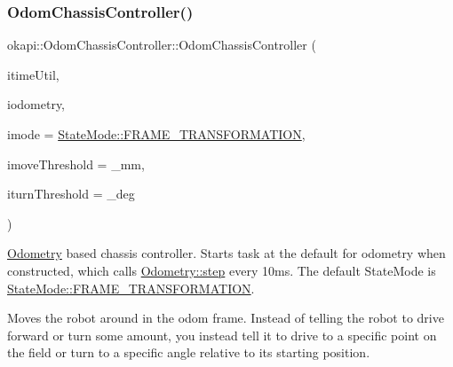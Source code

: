 \subsubsection{\texorpdfstring{OdomChassisController()}{OdomChassisController()}\hspace{0.1cm}{\footnotesize\ttfamily [1/3]}}
{\footnotesize\ttfamily okapi\+::\+Odom\+Chassis\+Controller\+::\+Odom\+Chassis\+Controller (\begin{DoxyParamCaption}\item[{const \mbox{\hyperlink{classokapi_1_1TimeUtil}{Time\+Util}} \&}]{itime\+Util,  }\item[{std\+::unique\+\_\+ptr$<$ \mbox{\hyperlink{classokapi_1_1Odometry}{Odometry}} $>$}]{iodometry,  }\item[{const \mbox{\hyperlink{namespaceokapi_af37fbd761bd859a00ff4dd4a87dd8c07}{State\+Mode}} \&}]{imode = {\ttfamily \mbox{\hyperlink{namespaceokapi_af37fbd761bd859a00ff4dd4a87dd8c07ad5ed7666e5cebf60d3af20a5a46edf3b}{State\+Mode\+::\+F\+R\+A\+M\+E\+\_\+\+T\+R\+A\+N\+S\+F\+O\+R\+M\+A\+T\+I\+ON}}},  }\item[{const Q\+Length \&}]{imove\+Threshold = {\+\_\+mm},  }\item[{const Q\+Angle \&}]{iturn\+Threshold = {\+\_\+deg} }\end{DoxyParamCaption})}

\mbox{\hyperlink{classokapi_1_1Odometry}{Odometry}} based chassis controller. Starts task at the default for odometry when constructed, which calls {\ttfamily \mbox{\hyperlink{classokapi_1_1Odometry_a04586a88418c606f7bbd0ac3287c730d}{Odometry\+::step}}} every {\ttfamily 10ms}. The default State\+Mode is {\ttfamily \mbox{\hyperlink{namespaceokapi_af37fbd761bd859a00ff4dd4a87dd8c07ad5ed7666e5cebf60d3af20a5a46edf3b}{State\+Mode\+::\+F\+R\+A\+M\+E\+\_\+\+T\+R\+A\+N\+S\+F\+O\+R\+M\+A\+T\+I\+ON}}}.

Moves the robot around in the odom frame. Instead of telling the robot to drive forward or turn some amount, you instead tell it to drive to a specific point on the field or turn to a specific angle relative to its starting position.


